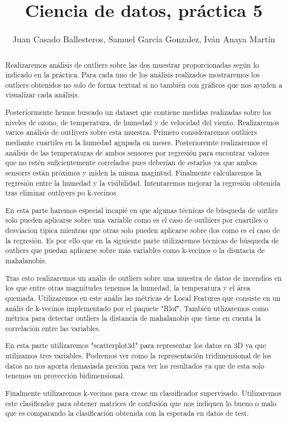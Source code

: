 \documentclass [a4paper] {article}
\title{Ciencia de datos, práctica 5}
\author{Juan Casado Ballesteros, Samuel García Gonzalez, Iván Anaya Martín}
\begin{document}
\maketitle

\begin{abstract}
Realizaremos análisis de outliers sobre las dos muestrar proporcionadas según lo indicado en la práctica.
Para cada uno de los análisis realizados mostraremos los outliers obtenidos no solo de forma textual si no también con gráficos que nos ayuden a visualizar cada análisis.

Posteriormente hemos buscado un dataset que contiene medidas realizadas sobre los niveles de ozono, de temperatura, de humedad y de velocidad del viento.
Realizaremos varios análisis de outliyers sobre esta muestra.
Primero consideraremos outliiers mediante cuartiles en la humedad agupada en meses.
Posterioremte realizaremos el análisis de las temperaturas de ambos sensores por regresión para encontrar valores que no estén suficientemente correlados pues deberían de estarlos ya que ambos sensorrs están próximos y miden la misma magintud.
Finalmente calcularemos la regresión entre la humedad y la visibilidad.
Intentaremos mejorar la regresión obtenida tras eliminar outliyers po k-vecinos.

En esta parte haremos especial incapié en que algunas técnicas de búsqueda de outlirs solo pueden aplicarse sobre una variable como es el caso de outliiers por cuartiles o desviacion tipica mientras que otras solo pueden aplicarse sobre dos como es el caso de la regresión.
Es por ello que en la siguiente parte utilizaremos técnicas de búsqueda de outliers que puedan aplicarse sobre más variables como k-vecinos o la disntacia de mahalanobis.

Tras esto realizaremos un anális de outliers sobre una muestra de datos de incendios en los que entre otras magnitudes tenemos la humedad, la temperatura y el área quemada.
Utilizaremos en este anális las métricas de Local Features que consiste en un anális de k-vecinos implementado por el paquete "Rlof".
También utlizaremos como métrica para detectar outliers la distancia de mahalanobis que tiene en cuenta la correlación entre las variables.

En esta parte utilizaremos "scatterplot3d" para representar los datos en 3D ya que utilizamos tres variables.
Podremos ver como la representación tridimensional de los datos no nos aporta demasiada preción para ver los resultados ya que de esta solo tenemos un proyección bidimensional.

Finalmente utilizaremos k-vecinos para creae un classificador supervisado.
Utilizaremos este clasificador para obtener matrices de confusión que nos indiquen lo bueno o malo que es comparando la clasificación obtenida con la esperada en datos de test.
\end{abstract}
\end{document}
